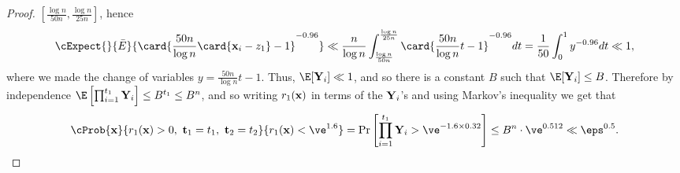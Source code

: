 \begin{proof}
  $\left[\frac{\log n}{50 n},\frac{\log n}{25 n}\right]$, hence
  \[
  \cExpect{}{\bar{E}}{\card{\frac{50n}{\log n}\card{{\bf x}_i - z_1} - 1}^{-0.96}}
  \ll\frac{n}{\log n}\int_{\frac{\log n}{50n}}^{\frac{\log n}{25n}}{\card{\frac{50n}{\log n}t - 1}^{-0.96} dt}
  =\frac{1}{50}\int_{0}^{1}{y^{-0.96} dt}
  \ll 1,
  \]
  where we made the change of variables $y = \frac{50n}{\log n}t - 1$.
  Thus, $\E[{\bf Y}_i] \ll 1$, and so there is a constant $B$ such that $\E[{\bf Y}_i]\leq B$.
  Therefore by independence $\E\left[\prod_{i=1}^{t_1} {\bf Y}_i\right]\leq B^{t_1}\leq B^n$,
  and so writing $r_1({\bf x})$ in terms of the ${\bf Y}_i$'s and using Markov's inequality we get that
  \[
    \cProb{{\bf x}}{r_1({\bf x})>0,~{\bf t}_1=t_1,~{\bf t}_2=t_2}{r_1({\bf x})<\ve^{1.6}}
    = \Pr\left[\prod_{i=1}^{t_1} {\bf Y}_i > \ve^{-1.6\times 0.32} \right] \leq B^n\cdot \ve^{0.512} \ll \eps^{0.5}.
  \qedhere
  \]
\end{proof}

